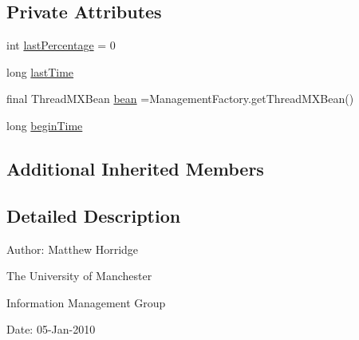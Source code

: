 \subsection*{Private Attributes}
\begin{DoxyCompactItemize}
\item 
int \hyperlink{classorg_1_1semanticweb_1_1owlapi_1_1reasoner_1_1_timed_console_progress_monitor_a497619010b9d24a05da3e92dc07b63bc}{last\-Percentage} = 0
\item 
long \hyperlink{classorg_1_1semanticweb_1_1owlapi_1_1reasoner_1_1_timed_console_progress_monitor_a56c23963a9278be3e9906590920b2473}{last\-Time}
\item 
final Thread\-M\-X\-Bean \hyperlink{classorg_1_1semanticweb_1_1owlapi_1_1reasoner_1_1_timed_console_progress_monitor_a52e2983bf04a72d870e7a7064d16afca}{bean} =Management\-Factory.\-get\-Thread\-M\-X\-Bean()
\item 
long \hyperlink{classorg_1_1semanticweb_1_1owlapi_1_1reasoner_1_1_timed_console_progress_monitor_a16f58f5826d8214d27846677b83781c7}{begin\-Time}
\end{DoxyCompactItemize}
\subsection*{Additional Inherited Members}


\subsection{Detailed Description}
Author\-: Matthew Horridge\par
 The University of Manchester\par
 Information Management Group\par
 Date\-: 05-\/\-Jan-\/2010 

